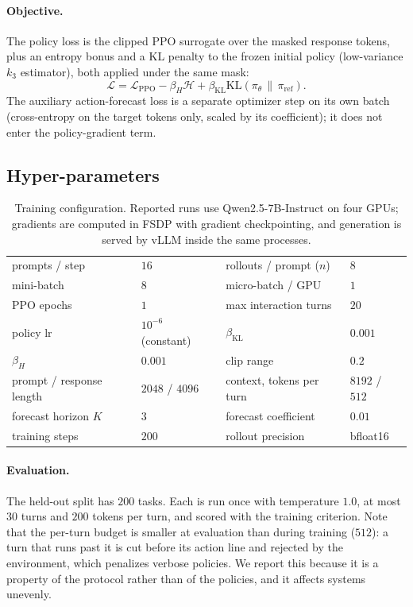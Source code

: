 \paragraph{Objective.}
The policy loss is the clipped PPO surrogate over the masked response tokens, plus an
entropy bonus and a KL penalty to the frozen initial policy (low-variance $k_3$
estimator), both applied under the same mask:
\[
\mathcal{L} = \mathcal{L}_{\text{PPO}} - \beta_{H} \mathcal{H} + \beta_{\mathrm{KL}}
\mathrm{KL}\!\left(\pi_\theta \,\|\, \pi_{\text{ref}}\right).
\]
The auxiliary action-forecast loss is a separate optimizer step on its own batch
(cross-entropy on the target tokens only, scaled by its coefficient); it does not enter
the policy-gradient term.

\subsection{Hyper-parameters}
\label{app:hparams}

\begin{table}[h]
\centering\small
\begin{tabular}{llll}
\toprule
prompts / step & $16$ & rollouts / prompt ($n$) & $8$ \\
mini-batch & $8$ & micro-batch / GPU & $1$ \\
PPO epochs & $1$ & max interaction turns & $20$ \\
policy lr & $10^{-6}$ (constant) & $\beta_{\mathrm{KL}}$ & $0.001$ \\
$\beta_{H}$ & $0.001$ & clip range & $0.2$ \\
prompt / response length & $2048$ / $4096$ & context, tokens per turn & $8192$ / $512$ \\
forecast horizon $K$ & $3$ & forecast coefficient & $0.01$ \\
training steps & $200$ & rollout precision & bfloat16 \\
\bottomrule
\end{tabular}
\caption{Training configuration. Reported runs use Qwen2.5-7B-Instruct on four GPUs;
gradients are computed in FSDP with gradient checkpointing, and generation is served by
vLLM inside the same processes.}
\end{table}

\paragraph{Evaluation.}
The held-out split has $200$ tasks. Each is run once with temperature $1.0$, at most $30$
turns and $200$ tokens per turn, and scored with the training criterion. Note that the
per-turn budget is smaller at evaluation than during training ($512$): a turn that runs
past it is cut before its action line and rejected by the environment, which penalizes
verbose policies. We report this because it is a property of the protocol rather than of
the policies, and it affects systems unevenly.

